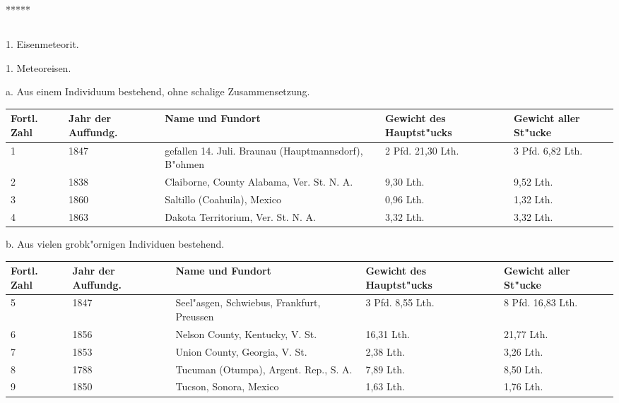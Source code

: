 \documentclass[a4paper, 11pt, oneside]{article}
\begin{document}
\centerline{*\hspace{15mm}*\hspace{15mm}*\hspace{15mm}*\hspace{15mm}*}
\clearpage
\subsection{}
\begin{center}
1. Eisenmeteorit.
\end{center}
\begin{center}
1. Meteoreisen.
\end{center}
\begin{center}
a. Aus einem Individuum bestehend, ohne schalige Zusammensetzung.
\end{center}
\begin{center}
\begin{footnotesize}
\begin{tabular}{ |p{7mm}|p{9mm}|p{45mm}|p{23mm}|p{20mm}| }
    \hline
    Fortl. Zahl & Jahr der Auffundg. & Name und Fundort & Gewicht des Hauptst"ucks & Gewicht aller St"ucke\\
    \hline\hline
    1 & 1847 & gefallen 14. Juli. Braunau (Hauptmannsdorf), B"ohmen & 2 Pfd. 21,30 Lth. & 3 Pfd. 6,82 Lth.\\\hline
    2 & 1838 & Claiborne, County Alabama, Ver. St. N. A. & 9,30 Lth. & 9,52 Lth.\\\hline
    3 & 1860 & Saltillo (Coahuila), Mexico & 0,96 Lth. & 1,32 Lth.\\\hline
    4 & 1863 & Dakota Territorium, Ver. St. N. A. & 3,32 Lth. & 3,32 Lth.\\
    \hline
\end{tabular}
\end{footnotesize}
\end{center}
\begin{center}
b. Aus vielen grobk"ornigen Individuen bestehend.
\end{center}
\begin{center}
\begin{footnotesize}
\begin{tabular}{ |p{7mm}|p{9mm}|p{45mm}|p{20mm}|p{23mm}| }
    \hline
    Fortl. Zahl & Jahr der Auffundg. & Name und Fundort & Gewicht des Hauptst"ucks & Gewicht aller St"ucke\\
    \hline\hline
    5 & 1847 & Seel"asgen, Schwiebus, Frankfurt, Preussen & 3 Pfd. 8,55 Lth. & 8 Pfd. 16,83 Lth.\\\hline
    6 & 1856 & Nelson County, Kentucky, V. St. & 16,31 Lth. & 21,77 Lth.\\\hline
    7 & 1853 & Union County, Georgia, V. St. & 2,38 Lth. & 3,26 Lth.\\\hline
    8 & 1788 & Tucuman (Otumpa), Argent. Rep., S. A. & 7,89 Lth. & 8,50 Lth.\\\hline
    9 & 1850 & Tucson, Sonora, Mexico & 1,63 Lth. & 1,76 Lth.\\
    \hline
\end{tabular}
\end{footnotesize}
\end{center}
\end{document}
